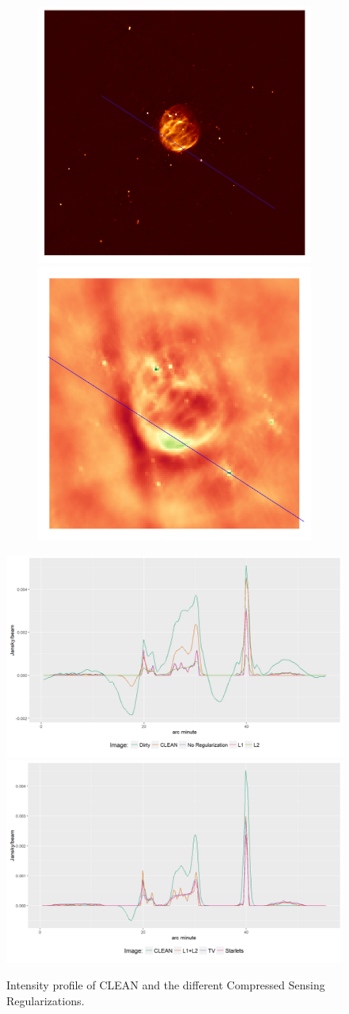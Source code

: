 \begin{figure}
	\centering
	\begin{subfigure}[b]{0.9\linewidth}
		\centering
		\includegraphics[width=0.3\linewidth, trim={180px 170px 170px 146px}, clip]{./chapters/05.results/pic_G55_7_lined.png}
		\includegraphics[width=0.3\linewidth, trim={18px 19px 18px 18px}, clip]{./chapters/05.results/raw_image_lined.png}
	\end{subfigure}

	\includegraphics[width=\linewidth, clip]{./chapters/05.results/df1.png}
	\includegraphics[width=\linewidth, clip]{./chapters/05.results/df2.png}
	\caption{Intensity profile of CLEAN and the different Compressed Sensing Regularizations.}
	\label{res:g55:profile}
\end{figure}

